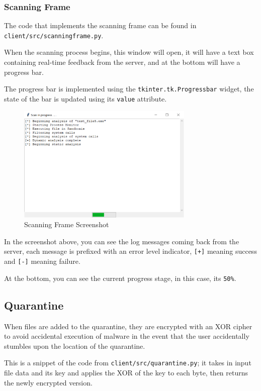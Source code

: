 \subsubsection{Scanning Frame}
The code that implements the scanning frame can
be found in \texttt{client/src/scanningframe.py}.

When the scanning process begins, this window will open,
it will have a text box containing real-time feedback from the server,
and at the bottom will have a progress bar.

The progress bar is implemented using the \texttt{tkinter.tk.Progressbar} widget,
the state of the bar is updated using its \texttt{value} attribute. 

\begin{figure}[h!]
    \centering
    \label{image:scanningFrameScreenshot}
    \includegraphics[width=0.75\textwidth]{images/screenshots/scanning_frame}
    \caption{Scanning Frame Screenshot}
\end{figure}

In the screenshot above, you can see the log messages coming back from the server,
each message is prefixed with an error level indicator, \texttt{[+]} meaning success
and \texttt{[-]} meaning failure.

At the bottom, you can see the current progress stage,
in this case, its \texttt{50\%}.

\subsection{Quarantine}
When files are added to the quarantine,
they are encrypted with an XOR cipher to avoid accidental
execution of malware in the event that the user
accidentally stumbles upon the location of the quarantine.

This is a snippet of the code from \texttt{client/src/quarantine.py};
it takes in input file data and its key and applies the XOR of the key to each byte,
then returns the newly encrypted version.


